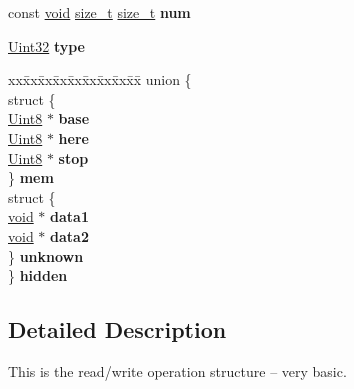 \begin{DoxyCompactItemize}
\item 
const \hyperlink{_s_d_l__audio_8h_a52835ae37c4bb905b903cbaf5d04b05f}{void} \hyperlink{struct_s_d_l___r_wops_aa7ef15421aa6f0b205322fcf0daa52d1}{size\+\_\+t} \hyperlink{struct_s_d_l___r_wops_aa7ef15421aa6f0b205322fcf0daa52d1}{size\+\_\+t} {\bfseries num}\hypertarget{struct_s_d_l___r_wops_ae3010566a844e562017f4cc824752d8f}{}\label{struct_s_d_l___r_wops_ae3010566a844e562017f4cc824752d8f}

\item 
\hyperlink{_s_d_l__stdinc_8h_add440eff171ea5f55cb00c4a9ab8672d}{Uint32} {\bfseries type}\hypertarget{struct_s_d_l___r_wops_aa40a9b05c3154032b9f2d7220e9f08dc}{}\label{struct_s_d_l___r_wops_aa40a9b05c3154032b9f2d7220e9f08dc}

\item 
\begin{tabbing}
xx\=xx\=xx\=xx\=xx\=xx\=xx\=xx\=xx\=\kill
union \{\\
\>struct \{\\
\>\>\hyperlink{_s_d_l__stdinc_8h_a2944638813a090aa23e62f4da842c3e2}{Uint8} $\ast$ {\bfseries base}\\
\>\>\hyperlink{_s_d_l__stdinc_8h_a2944638813a090aa23e62f4da842c3e2}{Uint8} $\ast$ {\bfseries here}\\
\>\>\hyperlink{_s_d_l__stdinc_8h_a2944638813a090aa23e62f4da842c3e2}{Uint8} $\ast$ {\bfseries stop}\\
\>\} {\bfseries mem}\\
\>struct \{\\
\>\>\hyperlink{_s_d_l__audio_8h_a52835ae37c4bb905b903cbaf5d04b05f}{void} $\ast$ {\bfseries data1}\\
\>\>\hyperlink{_s_d_l__audio_8h_a52835ae37c4bb905b903cbaf5d04b05f}{void} $\ast$ {\bfseries data2}\\
\>\} {\bfseries unknown}\\
\} {\bfseries hidden}\hypertarget{struct_s_d_l___r_wops_a1c0353cfe234345023b0d73a0907a0d3}{}\label{struct_s_d_l___r_wops_a1c0353cfe234345023b0d73a0907a0d3}
\\

\end{tabbing}\end{DoxyCompactItemize}


\subsection{Detailed Description}
This is the read/write operation structure -- very basic. 


